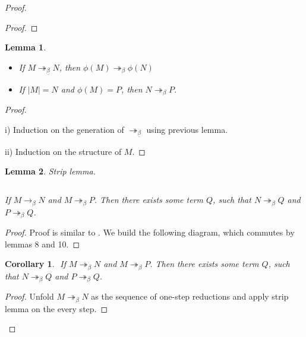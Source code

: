 \documentclass[a4paper]{article}
\newtheorem{lemma}{Lemma}
\newtheorem{col}{Corollary}
\begin{document}
\begin{proof}
\begin{proof}
\end{proof}

\begin{lemma}
  $ $

  \begin{itemize}
  \item If $M \twoheadrightarrow_{\underline{\beta}} N$, then $\phi(M) \twoheadrightarrow_{\beta} \phi(N)$
  \item If $|M| = N$ and $\phi(M) = P$, then $N \twoheadrightarrow_{\beta} P$.
  \end{itemize}
\end{lemma}

\begin{proof}
  $ $

  i) Induction on the generation of $\twoheadrightarrow_{\underline{\beta}}$ using previous lemma.

  ii) Induction on the structure of $M$.
\end{proof}

\begin{lemma} Strip lemma.

$ $

If $M \rightarrow_{\beta} N$ and $M \twoheadrightarrow_{\beta} P$. Then there exists some term $Q$, such that
$N \twoheadrightarrow_{\beta} Q$ and $P \twoheadrightarrow_{\beta} Q$.
\end{lemma}

\begin{proof}

Proof is similar to \cite{Baren} \cite{Baren2}. We build the following diagram, which commutes by lemmas 8 and 10.

\vspace{\baselineskip}

\end{proof}

\begin{col}
$ $
If $M \twoheadrightarrow_{\beta} N$ and $M \twoheadrightarrow_{\beta} P$. Then there exists some term $Q$, such that
$N \twoheadrightarrow_{\beta} Q$ and $P \twoheadrightarrow_{\beta} Q$.
\end{col}

\begin{proof}

  Unfold $M \twoheadrightarrow_{\beta} N$ as the sequence of one-step reductions and apply strip lemma on the every step.
\end{proof}

\end{proof}
\end{document}

